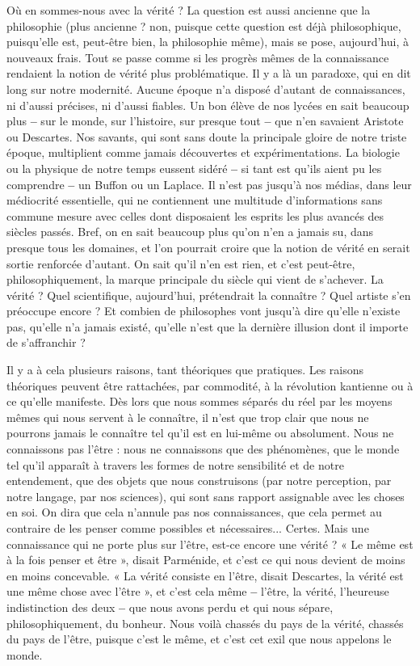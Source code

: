 Où en sommes-nous avec la vérité ? La question est aussi ancienne que la
philosophie (plus ancienne ? non, puisque cette question est déjà philosophique,
puisqu'elle est, peut-être bien, la philosophie même), mais se pose,
aujourd’hui, à nouveaux frais. Tout se passe comme si les progrès mêmes de
la connaissance rendaient la notion de vérité plus problématique. Il y a là un
paradoxe, qui en dit long sur notre modernité. Aucune époque n’a disposé
d'autant de connaissances, ni d’aussi précises, ni d’aussi fiables. Un bon élève
de nos lycées en sait beaucoup plus {\bf --} sur le monde, sur l’histoire, sur presque
tout {\bf --} que n'en savaient Aristote ou Descartes. Nos savants, qui sont sans
doute la principale gloire de notre triste époque, multiplient comme jamais
découvertes et expérimentations. La biologie ou la physique de notre temps
eussent sidéré {\bf --} si tant est qu’ils aient pu les comprendre {\bf --} un Buffon ou un
Laplace. Il n’est pas jusqu’à nos médias, dans leur médiocrité essentielle, qui
ne contiennent une multitude d’informations sans commune mesure avec
celles dont disposaient les esprits les plus avancés des siècles passés. Bref, on
en sait beaucoup plus qu’on n’en a jamais su, dans presque tous les domaines,
et l’on pourrait croire que la notion de vérité en serait sortie renforcée
d'autant. On sait qu’il n’en est rien, et c’est peut-être, philosophiquement, la
marque principale du siècle qui vient de s'achever. La vérité ? Quel scientifique,
aujourd’hui, prétendrait la connaître ? Quel artiste s’en préoccupe
encore ? Et combien de philosophes vont jusqu’à dire qu’elle n’existe pas,
qu’elle n’a jamais existé, qu’elle n’est que la dernière illusion dont il importe
de s’affranchir ?

Il y a à cela plusieurs raisons, tant théoriques que pratiques. Les raisons
théoriques peuvent être rattachées, par commodité, à la révolution kantienne
ou à ce qu'elle manifeste. Dès lors que nous sommes séparés du réel par les
moyens mêmes qui nous servent à le connaître, il n’est que trop clair que nous
ne pourrons jamais le connaître tel qu’il est en lui-même ou absolument. Nous
ne connaissons pas l’être : nous ne connaissons que des phénomènes, que le
monde tel qu’il apparaît à travers les formes de notre sensibilité et de notre
entendement, que des objets que nous construisons (par notre perception, par
notre langage, par nos sciences), qui sont sans rapport assignable avec les choses
en soi. On dira que cela n’annule pas nos connaissances, que cela permet au
contraire de les penser comme possibles et nécessaires... Certes. Mais une
connaissance qui ne porte plus sur l’être, est-ce encore une vérité ? « Le même
est à la fois penser et être », disait Parménide, et c’est ce qui nous devient de
moins en moins concevable. « La vérité consiste en l’être, disait Descartes, la
vérité est une même chose avec l’être », et c’est cela même {\bf --} l’être, la vérité,
l’heureuse indistinction des deux {\bf --} que nous avons perdu et qui nous sépare,
philosophiquement, du bonheur. Nous voilà chassés du pays de la vérité,
chassés du pays de l'être, puisque c’est le même, et c’est cet exil que nous appelons
le monde.

